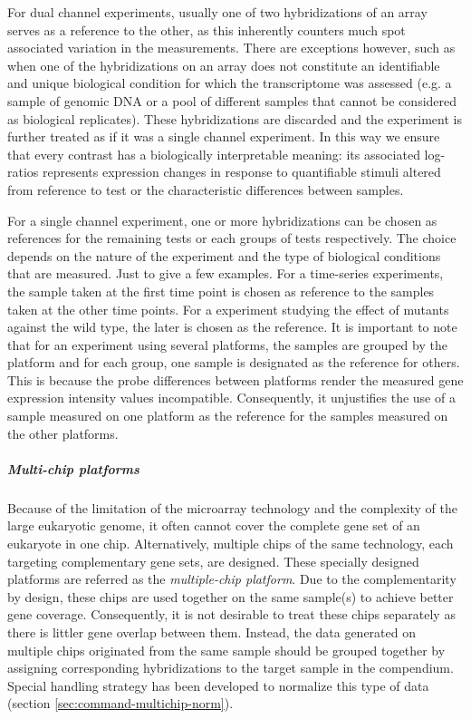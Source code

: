 For dual channel experiments, usually one of two hybridizations of an array
serves as a reference to the other, as this inherently counters much spot
associated variation in the measurements.
%
There are exceptions however, such as when one of the hybridizations on an
array does not constitute an identifiable and unique biological condition for
which the transcriptome was assessed (e.g. a sample of genomic DNA or a pool of
different samples that cannot be considered as biological replicates).
%
These hybridizations are discarded and the experiment is further treated as if
it was a single channel experiment.
%
In this way we ensure that every contrast has a biologically interpretable
meaning: its associated log-ratios represents expression changes in response
to quantifiable stimuli altered from reference to test or the characteristic
differences between samples.

For a single channel experiment, one or more hybridizations can be chosen as
references for the remaining tests or each groups of tests respectively.
%
The choice depends on the nature of the experiment and the type of biological
conditions that are measured.
%
Just to give a few examples.  For a time-series experiments, the sample taken
at the first time point is chosen as reference to the samples taken at the
other time points.  For a experiment studying the effect of mutants against the
wild type, the later is chosen as the reference.
%
It is important to note that for an experiment using several platforms, the
samples are grouped by the platform and for each group, one sample is
designated as the reference for others.  This is because the probe differences
between platforms render the measured gene expression intensity values
incompatible.  Consequently, it unjustifies the use of a sample measured on
one platform as the reference for the samples measured on the other platforms.



\subparagraph{Multi-chip platforms}
Because of the limitation of the microarray technology and the complexity of
the large eukaryotic genome, it often cannot cover the complete gene set of an
eukaryote in one chip.
%
Alternatively, multiple chips of the same technology, each targeting
complementary gene sets, are designed.
%
These specially designed platforms are referred as the \textit{multiple-chip
  platform}.
%
Due to the complementarity by design, these chips are used together on the
same sample(s) to achieve better gene coverage.
%
Consequently, it is not desirable to treat these chips separately as there is
littler gene overlap between them.
%
Instead, the data generated on multiple chips originated from the same sample
should be grouped together by assigning corresponding hybridizations to the
target sample in the compendium.
%
Special handling strategy has been developed to normalize this type of data
(section \ref{sec:command-multichip-norm}).






